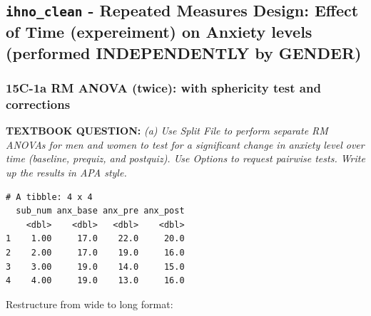 \documentclass[]{article}
\newenvironment{Shaded}{\begin{snugshade}}{\end{snugshade}}
\newcommand{\KeywordTok}[1]{\textcolor[rgb]{0.13,0.29,0.53}{\textbf{#1}}}
\newcommand{\DataTypeTok}[1]{\textcolor[rgb]{0.13,0.29,0.53}{#1}}
\newcommand{\DecValTok}[1]{\textcolor[rgb]{0.00,0.00,0.81}{#1}}
\newcommand{\StringTok}[1]{\textcolor[rgb]{0.31,0.60,0.02}{#1}}
\newcommand{\OperatorTok}[1]{\textcolor[rgb]{0.81,0.36,0.00}{\textbf{#1}}}
\newcommand{\NormalTok}[1]{#1}
\begin{document}
\clearpage

\subsection{\texorpdfstring{\texttt{ihno\_clean} - Repeated Measures
Design: Effect of Time (expereiment) on Anxiety levels (performed
INDEPENDENTLY by
GENDER)}{ihno\_clean - Repeated Measures Design: Effect of Time (expereiment) on Anxiety levels (performed INDEPENDENTLY by GENDER)}}\label{ihno_clean---repeated-measures-design-effect-of-time-expereiment-on-anxiety-levels-performed-independently-by-gender}

\subsubsection{15C-1a RM ANOVA (twice): with sphericity test and
corrections}\label{c-1a-rm-anova-twice-with-sphericity-test-and-corrections}

\textbf{TEXTBOOK QUESTION:} \emph{(a) Use Split File to perform separate
RM ANOVAs for men and women to test for a significant change in anxiety
level over time (baseline, prequiz, and postquiz). Use Options to
request pairwise tests. Write up the results in APA style.}

\begin{Shaded}
\end{Shaded}

\begin{verbatim}
# A tibble: 4 x 4
  sub_num anx_base anx_pre anx_post
    <dbl>    <dbl>   <dbl>    <dbl>
1    1.00     17.0    22.0     20.0
2    2.00     17.0    19.0     16.0
3    3.00     19.0    14.0     15.0
4    4.00     19.0    13.0     16.0
\end{verbatim}

Restructure from wide to long format:
\end{document}

